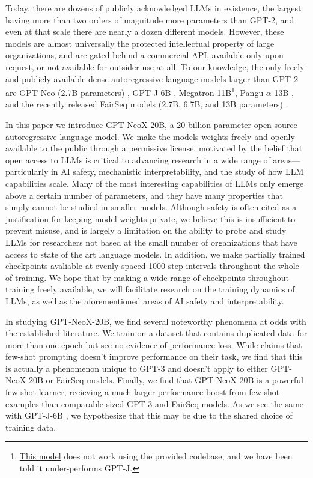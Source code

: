 \documentclass[11pt]{article}
\newcommand{\model}{GPT-NeoX-20B}
\begin{document}
Today, there are dozens of publicly acknowledged LLMs in existence, the largest having more than two orders of magnitude more parameters than GPT-2, and even at that scale there are nearly a dozen different models. However, these models are almost universally the protected intellectual property of large organizations, and are gated behind a commercial API, available only upon request, or not available for outsider use at all. To our knowledge, the only freely and publicly available dense autoregressive language models larger than GPT-2 are GPT-Neo (2.7B parameters) \citep{black2021gpt}, GPT-J-6B \citep{gpt-j}, Megatron-11B\footnote{\href{https://github.com/pytorch/fairseq/tree/main/examples/megatron\_11b}{This model} does not work using the provided codebase, and we have been told it under-performs GPT-J.}, Pangu-$\alpha$-13B \citep{zeng2021pangualpha}, and the recently released FairSeq models (2.7B, 6.7B, and 13B parameters) \citep{fairseq-13B}.

In this paper we introduce \model{}, a 20 billion parameter open-source autoregressive language model. We make the models weights freely and openly available to the public through a permissive license, motivated by the belief that open access to LLMs is critical to advancing research in a wide range of areas---particularly in AI safety, mechanistic interpretability, and the study of how LLM capabilities scale. Many of the most interesting capabilities of LLMs only emerge above a certain number of parameters, and they have many properties that simply cannot be studied in smaller models. Although safety is often cited as a justification for keeping model weights private, we believe this is insufficient to prevent misuse, and is largely a limitation on the ability to probe and study LLMs for researchers not based at the small number of organizations that have access to state of the art language models. In addition, we make partially trained checkpoints avaliable at evenly spaced 1000 step intervals throughout the whole of training. We hope that by making a wide range of checkpoints throughout training freely available, we will facilitate research on the training dynamics of LLMs, as well as the aforementioned areas of AI safety and interpretability.

In studying \model{}, we find several noteworthy phenomena at odds with the established literature. We train on a dataset that contains duplicated data for more than one epoch but see no evidence of performance loss. While \citep{hendrycks2020measuring} claims that few-shot prompting doesn't improve performance on their task, we find that this is actually a phenomenon unique to GPT-3 and doesn't apply to either \model{} or FairSeq models. Finally, we find that \model{} is a powerful few-shot learner, recieving a much larger performance boost from few-shot examples than comparable sized GPT-3 and FairSeq models. As we see the same with GPT-J-6B \citep{gpt-j}, we hypothesize that this may be due to the shared choice of training data.
\end{document}
